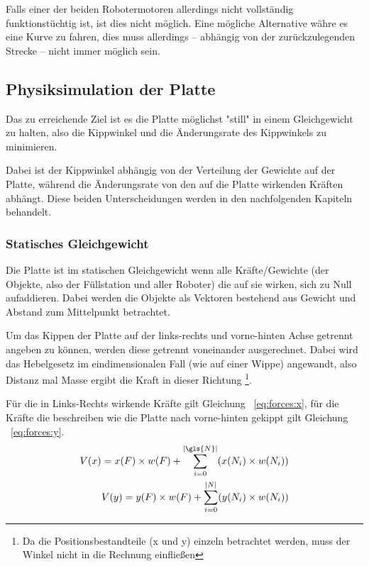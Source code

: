 Falls einer der beiden Robotermotoren allerdings nicht vollst{\"{a}}ndig funktionst{\"{u}}chtig ist, ist dies nicht m{\"{o}}glich. Eine m{\"{o}}gliche
Alternative w{\"{a}}hre es eine Kurve zu fahren, dies muss allerdings -- abh{\"{a}}ngig von der zur{\"{u}}ckzulegenden Strecke -- nicht immer m{\"{o}}glich
sein.

\subsection{Physiksimulation der Platte}
Das zu erreichende Ziel ist es die Platte m{\"{o}}glichst "still" in einem Gleichgewicht zu halten, also
die Kippwinkel und die {\"{A}}nderungsrate des Kippwinkels zu minimieren.

Dabei ist der Kippwinkel abh{\"{a}}ngig von der Verteilung der Gewichte auf der Platte, w{\"{a}}hrend die
{\"{A}}nderungsrate von den auf die Platte wirkenden Kr{\"{a}}ften abh{\"{a}}ngt. Diese beiden Unterscheidungen
werden in den nachfolgenden Kapiteln behandelt.

\subsubsection{Statisches Gleichgewicht}
Die Platte ist im statischen Gleichgewicht wenn alle Kr{\"{a}}fte/Gewichte (der Objekte, also der F{\"{u}}llstation und aller Roboter) die auf sie wirken, sich zu Null aufaddieren.
Dabei werden die Objekte als Vektoren bestehend aus Gewicht und Abstand zum Mittelpunkt betrachtet.

Um das Kippen der Platte auf der links-rechts und vorne-hinten Achse getrennt angeben zu k{\"{o}}nnen, werden diese getrennt voneinander ausgerechnet. Dabei wird das Hebelgesetz
im eindimensionalen Fall (wie auf einer Wippe) angewandt, also Distanz mal Masse ergibt die Kraft in dieser Richtung
\footnote{Da die Positionsbestandteile (x und y) einzeln betrachtet werden, muss der Winkel nicht in die Rechnung einflie{\ss}en}.

F{\"{u}}r die in Links-Rechts wirkende Kr{\"{a}}fte gilt Gleichung ~\ref{eq:forces:x}, f{\"{u}}r die Kr{\"{a}}fte die beschreiben wie die Platte nach vorne-hinten gekippt
gilt Gleichung ~\ref{eq:forces:y}.
\begin{subequations}\label{eq:forces}
\begin{align}
	V(x) = x(F) \times w(F) + \sum_{i=0}^{|\gls{N}|} ( x(N_i) \times w(N_i) ) \label{eq:forces:x}\\
	V(y) = y(F) \times w(F) + \sum_{i=0}^{|N|} ( y(N_i) \times w(N_i) ) \label{eq:forces:y}
\end{align}
\end{subequations}

